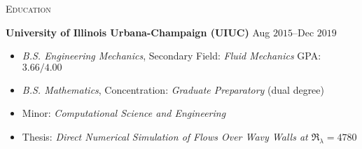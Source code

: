 \documentclass[10pt]{article}
\begin{document}
%

\begin{multicols}{2}
\textsc{Education}
\columnbreak

%
%
%
\textbf{University of Illinois Urbana-Champaign (UIUC)} \hfill Aug $2015$--Dec $2019$

\vspace{-1.75em}
\begin{itemize}[label= ]
    \setlength\itemsep{-0.25em}
    \setlength{\itemindent}{-1.50em}
    \item \textit{B.S. Engineering Mechanics}, Secondary Field: \textit{Fluid Mechanics} \hfill GPA: $3.66/4.00$
    \item \textit{B.S. Mathematics}, Concentration: \textit{Graduate Preparatory} \hfill (dual degree)
    \item Minor: \textit{Computational Science and Engineering}
    \item Thesis: \textit{Direct Numerical Simulation of Flows Over Wavy Walls at $\Re_\lambda=4780$}
\end{itemize}
\vspace{-2.0em}

\end{multicols}
\end{document}
